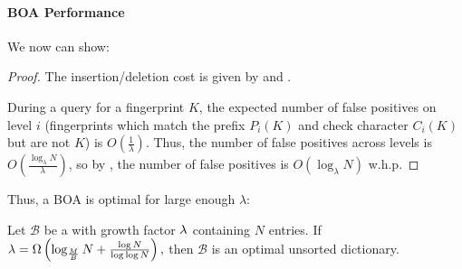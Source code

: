 \paragraph{BOA Performance}
We now can show:

\boacost*

\begin{proof}
	The insertion/deletion cost is given by 
	and .

	During a query for a fingerprint $K$, the expected number of false positives 
	on level $i$ (fingerprints which match the prefix $P_i(K)$ and check
	character $C_i(K)$ but are not $K$) is $O\left(\frac{1}{\lambda}\right)$.
	Thus, the number of false positives across levels is
	$O\left(\frac{\log_\lambda N}{\lambda}\right)$, so by ,
	the number of false positives is $O\left(\log_\lambda N\right)$ w.h.p.
\end{proof}

Thus, a BOA is optimal for large enough $\lambda$:

\begin{corollary}
	Let $\mathcal{B}$ be a \boa{} with growth factor $\lambda$ containing $N$
	entries. If $\lambda = \Omega\left(\log_\frac{M}{B}{N} +
	\frac{\log{N}}{\log\log{N}}\right),$ then $\mathcal{B}$ is an optimal
	unsorted dictionary.
\end{corollary}


